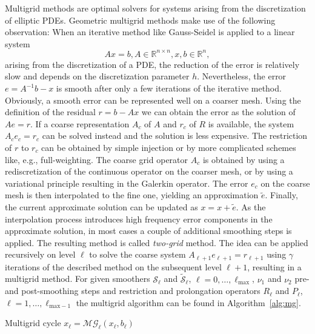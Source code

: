 Multigrid methods are optimal solvers for systems arising from the
discretization of elliptic PDEs. Geometric multigrid methods make use of the
following observation: When an iterative method like Gauss-Seidel is
applied to a linear system
\[
  A x = b, A \in \mathbb{R}^{n \times n}, x, b \in \mathbb{R}^n,
\]
arising from the discretization of a PDE, the reduction of the error
is relatively slow and depends on the discretization parameter
$h$. Nevertheless, the error $e = A^{-1} b - x$ is smooth after only a
few iterations of the iterative method. Obviously, a smooth error can
be represented well on a coarser mesh. Using the definition of the
residual $r = b - A x$ we can obtain the error as the solution of
$A e = r$. If a coarse representation $A_c$ of $A$ and $r_c$ of $R$ is
available, the system $A_c e_c = r_c$ can be solved instead and the
solution is less expensive. The restriction of $r$ to $r_c$ can be
obtained by simple injection or by more complicated schemes like,
e.g., full-weighting. The coarse grid operator $A_c$ is obtained by
using a rediscretization of the continuous operator on the coarser
mesh, or by using a variational principle resulting in the Galerkin
operator. The error $e_c$ on the coarse mesh is then interpolated to
the fine one, yielding an approximation $\tilde{e}$. Finally, the
current approximate solution can be updated as $x = x + \tilde{e}$. As
the interpolation process introduces high frequency error components
in the approximate solution, in most cases a couple of additional
smoothing steps is applied. The resulting method is called
\emph{two-grid} method. The idea can be applied recursively on level
$\ell$ to solve the coarse system $A_{\ell+1} e_{\ell+1} = r_{\ell+1}$
using $\gamma$ iterations of the described method on the subsequent
level $\ell+1$, resulting in a multigrid method. For given smoothers
$\mathcal{S}_\ell$ and $\tilde{\mathcal{S}}_\ell$,
$\ell = 0,\dots,\ell_\text{max}$, $\nu_1$ and $\nu_2$ pre- and
post-smoothing steps and restriction and prolongation operators
$R_\ell$ and $P_\ell$, $\ell = 1,\dots,\ell_{\text{max}-1}$ the
multigrid algorithm can be found in Algorithm~\ref{alg:mg}.

\begin{algorithm}
  \caption{Multigrid cycle $x_\ell = \mathcal{MG}_\ell(x_\ell,b_\ell)$}
  \label{alg:mg}
  \begin{algorithmic}
  \ELSE
  \ENDIF
  \end{algorithmic}
\end{algorithm}


